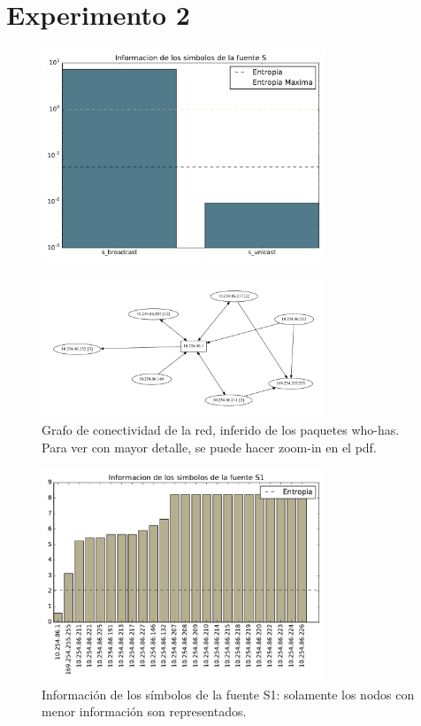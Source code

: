 \section{Experimento 2}

\begin{figure}[H]
  \centering
  \includegraphics[width=8.5cm]{exp_starbucks/grafico1.pdf}
  \caption{\normalfont }
\end{figure}

\begin{figure}[H]
  \centering
  \includegraphics[width=8.5cm]{exp_starbucks/grafico2.pdf}
  \caption{  \normalfont Grafo de conectividad de la red, inferido de los paquetes who-has. Para ver con mayor detalle, se puede hacer zoom-in en el pdf. }
\end{figure}

\begin{figure}[H]
  \centering
  \includegraphics[width=8.5cm]{exp_starbucks/grafico3.pdf}
  \caption{ \normalfont Información de los símbolos de la fuente S1: solamente los nodos con menor información son representados.}
\end{figure}
